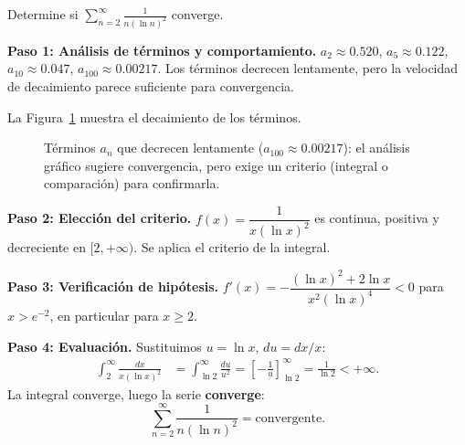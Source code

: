 \begin{example} 
Determine si $\displaystyle\sum_{n=2}^\infty \frac{1}{n(\ln n)^2}$ converge.
\begin{myproof}
\textbf{Paso 1: Análisis de términos y comportamiento.}
$a_2 \approx 0.520$, $a_5 \approx 0.122$, $a_{10} \approx 0.047$,
$a_{100} \approx 0.00217$. Los términos decrecen lentamente, pero la
velocidad de decaimiento parece suficiente para convergencia.

La Figura~\ref{fig:terminos_decaimiento_lento} muestra el decaimiento de los términos.

\begin{figure}[H]
\centering
{}
\caption{Términos $a_n$ que decrecen lentamente ($a_{100}\approx 0.00217$): el análisis gráfico sugiere convergencia, pero exige un criterio (integral o comparación) para confirmarla.}
\label{fig:terminos_decaimiento_lento}
\end{figure}

\textbf{Paso 2: Elección del criterio.}
$f(x) = \dfrac{1}{x(\ln x)^2}$ es continua, positiva y decreciente en
$[2,+\infty)$. Se aplica el criterio de la integral.

\textbf{Paso 3: Verificación de hipótesis.}
$f'(x) = -\dfrac{(\ln x)^2 + 2\ln x}{x^2(\ln x)^4} < 0$ para $x > e^{-2}$,
en particular para $x \geq 2$.

\textbf{Paso 4: Evaluación.}
Sustituimos $u = \ln x$, $du = dx/x$:
\begin{align*}
  \int_2^\infty \frac{dx}{x(\ln x)^2}
  &= \int_{\ln 2}^\infty \frac{du}{u^2}
   = \left[-\frac{1}{u}\right]_{\ln 2}^{\infty}
   = \frac{1}{\ln 2} < +\infty.
\end{align*}
La integral converge, luego la serie \textbf{converge}:
\[
  \sum_{n=2}^\infty \frac{1}{n(\ln n)^2} = \boxed{\text{convergente.}}
\]
\end{myproof}
\end{example}



